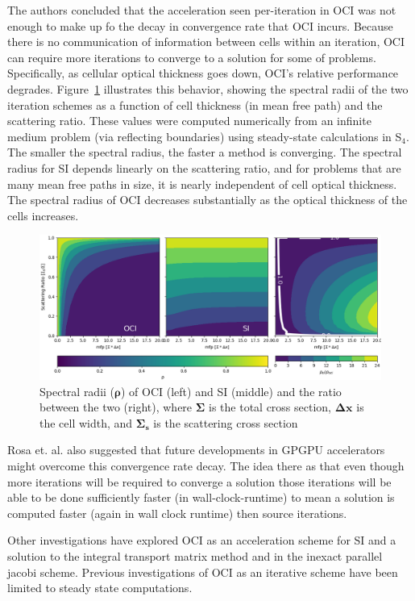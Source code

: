 The authors concluded that the acceleration seen per-iteration in OCI was not enough to make up fo the decay in convergence rate that OCI incurs.
Because there is no communication of information between cells within an iteration, OCI can require more iterations to converge to a solution for some of problems. 
Specifically, as cellular optical thickness goes down, OCI's relative performance degrades.
Figure~\ref{fig:specrad} illustrates this behavior, showing the spectral radii of the two iteration schemes as a function of cell thickness (in mean free path) and the scattering ratio.
These values were computed numerically from an infinite medium problem (via reflecting boundaries) using steady-state calculations in S$_4$. 
The smaller the spectral radius, the faster a method is converging.
The spectral radius for SI depends linearly on the scattering ratio, and for problems that are many mean free paths in size, it is nearly independent of cell optical thickness. 
The spectral radius of OCI decreases substantially as the optical thickness of the cells increases.
\begin{figure}[!htb]
    \centering
    \includegraphics[width=(.9\textwidth)]{figures/spec_rad.png}
    \caption{Spectral radii ($\boldsymbol{\rho}$) of OCI (left) and SI (middle) and the ratio between the two (right), where $\boldsymbol{\Sigma}$ is the total cross section, $\boldsymbol{\Delta x}$ is the cell width, and $\boldsymbol{\Sigma_s}$ is the scattering cross section}
    \label{fig:specrad}
  \end{figure}
Rosa et. al. also suggested that future developments in GPGPU accelerators might overcome this convergence rate decay.
The idea there as that even though more iterations will be required to converge a solution those iterations will be able to be done sufficiently faster (in wall-clock-runtime) to mean a solution is computed faster (again in wall clock runtime) then source iterations.

Other investigations have explored OCI as an acceleration scheme for SI \cite{anistratov_iterative_2015, hoagland_hybrid_2021} and a solution to the integral transport matrix method \citep{raffi2108pidotscom} and in the inexact parallel jacobi scheme.
Previous investigations of OCI as an iterative scheme have been limited to steady state computations.

